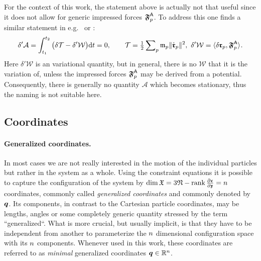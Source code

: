 For the context of this work, the statement above is actually not that useful since it does not allow for generic impressed forces $\particleForceImpressed{\PidxI}$.
To address this one finds a similar statement in e.g.\ \cite[eq.\,12.2.14]{Lurie:AnalyticalMechanics} or \cite[sec.\ I.3]{Szabo:HM}:
\begin{align}\label{eq:HamiltonPrinciple}
 \delta'\mathcal{A} = \int_{t_1}^{t_2} \big( \delta \kineticEnergy - \delta'\mathcal{W} \big) \d t = 0, 
\qquad
 \kineticEnergy = \tfrac{1}{2} \sumParticles \particleMass{\PidxI} \norm{\particlePosd{\PidxI}}^2, \ \delta'\mathcal{W} = \sProd{\delta \particlePos{\PidxI}}{\particleForceImpressed{\PidxI}}.
\end{align}
Here $\delta'\mathcal{W}$ is an variational quantity, but in general, there is no $\mathcal{W}$ that it is the variation of, unless the impressed forces $\particleForceImpressed{\PidxI}$ may be derived from a potential.
Consequently, there is generally no quantity $\mathcal{A}$ which becomes stationary, thus the naming is not suitable here.

\subsection{Coordinates}\label{sec:MechConstrainedCoordinates}
\paragraph{Generalized coordinates.} 
In most cases we are not really interested in the motion of the individual particles but rather in the system as a whole.
Using the constraint equations it is possible to capture the configuration of the system by $\dim\particleConfigSpace = 3\numParticles - \rank\pdiff[\particleGeoConstraint]{\particleCoord} = \dimConfigSpace$ coordinates, commonly called \textit{generalized coordinates} and commonly denoted by $\genCoord$.
Its components, in contrast to the Cartesian particle coordinates, may be lengths, angles or some completely generic quantity stressed by the term ``generalized``.
What is more crucial, but usually implicit, is that they have to be independent from another to parameterize the $\dimConfigSpace$ dimensional configuration space with its $\dimConfigSpace$ components.
Whenever used in this work, these coordinates are referred to as \textit{minimal} generalized coordinates $\genCoord\in\RealNum^\dimConfigSpace$.

